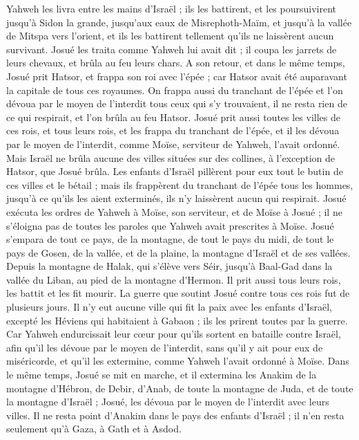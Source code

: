 \begin{multicols}{2}
Yahweh les livra entre les mains d’Israël ; ils les battirent, et les poursuivirent jusqu’à Sidon la grande, jusqu’aux eaux de Misrephoth-Maïm, et jusqu’à la vallée de Mitspa vers l’orient, et ils les battirent tellement qu’ils ne laissèrent aucun survivant.
Josué les traita comme Yahweh lui avait dit ; il coupa les jarrets de leurs chevaux, et brûla au feu leurs chars.
A son retour, et dans le même temps, Josué prit Hatsor, et frappa son roi avec l’épée ; car Hatsor avait été auparavant la capitale de tous ces royaumes.
On frappa aussi du tranchant de l’épée et l’on dévoua par le moyen de l'interdit tous ceux qui s’y trouvaient, il ne resta rien de ce qui respirait, et l’on brûla au feu Hatsor.
Josué prit aussi toutes les villes de ces rois, et tous leurs rois, et les frappa du tranchant de l’épée, et il les dévoua par le moyen de l'interdit, comme Moïse, serviteur de Yahweh, l’avait ordonné.
Mais Israël ne brûla aucune des villes situées sur des collines, à l’exception de Hatsor, que Josué brûla.
Les enfants d’Israël pillèrent pour eux tout le butin de ces villes et le bétail ; mais ils frappèrent du tranchant de l’épée tous les hommes, jusqu’à ce qu’ils les aient exterminés, ils n’y laissèrent aucun qui respirait.
Josué exécuta les ordres de Yahweh à Moïse, son serviteur, et de Moïse à Josué ; il ne s’éloigna pas de toutes les paroles que Yahweh avait prescrites à Moïse.
Josué s’empara de tout ce pays, de la montagne, de tout le pays du midi, de tout le pays de Gosen, de la vallée, et de la plaine, la montagne d’Israël et de ses vallées.
Depuis la montagne de Halak, qui s’élève vers Séir, jusqu’à Baal-Gad dans la vallée du Liban, au pied de la montagne d’Hermon. Il prit aussi tous leurs rois, les battit et les fit mourir.
La guerre que soutint Josué contre tous ces rois fut de plusieurs jours.
Il n’y eut aucune ville qui fit la paix avec les enfants d’Israël, excepté les Héviens qui habitaient à Gabaon ; ils les prirent toutes par la guerre.
Car Yahweh endurcissait leur cœur pour qu’ils sortent en bataille contre Israël, afin qu’il les dévoue par le moyen de l'interdit, sans qu’il y ait pour eux de miséricorde, et qu’il les extermine, comme Yahweh l’avait ordonné à Moïse.
Dans le même temps, Josué se mit en marche, et il extermina les Anakim de la montagne d’Hébron, de Debir, d’Anab, de toute la montagne de Juda, et de toute la montagne d’Israël ; Josué, les dévoua par le moyen de l'interdit avec leurs villes.
Il ne resta point d’Anakim dans le pays des enfants d’Israël ; il n’en resta seulement qu’à Gaza, à Gath et à Asdod.

\end{multicols}
